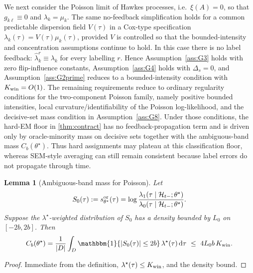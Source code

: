\documentclass{statsoc}
\newtheorem{lemma}[lemma]{Lemma}
\newcommand{\dd}{\mathrm{d}}
\newcommand{\1}{\mathbbm{1}}
\begin{document}
We next consider the Poisson limit of Hawkes processes, i.e.\ \(\xi(A)=0\), so that \(g_{k\ell}\equiv 0\) and \(\lambda_k=\mu_k\). The same no-feedback simplification holds for a common predictable dispersion field \(V(\tau)\) in a Cox-type specification \(\lambda_k(\tau)=V(\tau)\mu_k(\tau)\), provided \(V\) is controlled so that the bounded-intensity and concentration assumptions continue to hold. In this case there is no label feedback: \(\widehat\lambda_k^r\equiv \lambda_k\) for every labelling \(r\). Hence Assumption~\ref{ass:G3} holds with zero flip-influence constants, Assumption~\ref{ass:G4} holds with \(\Delta_s=0\), and Assumption~\ref{ass:G2prime} reduces to a bounded-intensity condition with \(K_{\rm win}=O(1)\). The remaining requirements reduce to ordinary regularity conditions for the two-component Poisson family, namely positive bounded intensities, local curvature/identifiability of the Poisson log-likelihood, and the decisive-set mass condition in Assumption~\ref{ass:G8}. Under those conditions, the hard-EM floor in \cref{thm:contract} has no feedback-propagation term and is driven only by oracle-minority mass on decisive sets together with the ambiguous-band mass \(C_b(\theta^\star)\). Thus hard assignments may plateau at this classification floor, whereas SEM-style averaging can still remain consistent because label errors do not propagate through time. 


\begin{lemma}[Ambiguous-band mass for Poisson]\label{lem:poisson-Cb}
Let
\[
S_0(\tau):=s^{\rm or}_{\theta^\star}(\tau)
=\log\frac{\lambda_1(\tau\mid\mathcal H_{t-};\theta^\star)}{\lambda_0(\tau\mid\mathcal H_{t-};\theta^\star)}.
\]
Suppose the $\lambda^\star$-weighted distribution of $S_0$ has a density bounded by $L_0$ on $[-2b,2b]$. Then
\[
C_b(\theta^\star)
=\frac{1}{|D|}\int_D \1\{|S_0(\tau)|\le 2b\}\,\lambda^\star(\tau)\,\dd\tau
\ \le\ 4L_0 b\,K_{\rm win}.
\]
\end{lemma}

\begin{proof}
Immediate from the definition, $\lambda^\star(\tau)\le K_{\rm win}$, and the density bound.
\end{proof}
\end{document}
